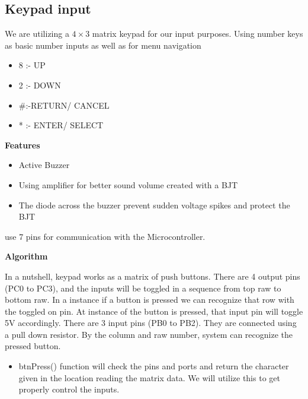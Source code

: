 \newpage
\subsection{Keypad input}

We are utilizing a $4\times3$ matrix keypad for our input purposes. Using number keys as basic number inputs as well as for menu navigation

\normalsize
\begin{itemize}
    \item 8 :- UP
	\item 2 :- DOWN
	\item \#:-RETURN/ CANCEL
	\item * :- ENTER/ SELECT
\end{itemize}

\Large \textbf{Features}
\normalsize
\begin{itemize}
  \item Active Buzzer 
  \item Using amplifier for better sound volume created with a BJT
  \item The diode across the buzzer prevent sudden voltage spikes and protect the BJT	
\end{itemize}

use 7 pins for communication with the Microcontroller.
\vspace{5mm}

\Large \textbf{Algorithm}

\normalsize{In a nutshell, keypad works as a matrix of push buttons. There are 4 output pins (PC0 to PC3), and the inputs will be toggled in a sequence from top raw to bottom raw. In a instance if a button is pressed we can recognize that row with the toggled on pin. At instance of the button is pressed, that input pin will toggle 5V accordingly. There are 3 input pins (PB0 to PB2). They are connected using a pull down resistor. By the column and raw number, system can recognize the pressed button.}

\begin{itemize}
  \item btnPress() function will check the pins and ports and return the character given in the location reading the matrix data. We will utilize this to get properly control the inputs. 
\end{itemize}



